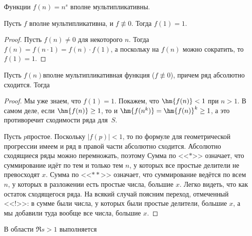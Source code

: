 \documentclass[a4paper]{article}
\def\nequiv{\not\equiv}
\begin{document}
\begin{ex}
Функции $f(n) = n^s$ вполне мультипликативны.
\end{ex}

\begin{stm}
Пусть $f$ вполне мультипликативна, и $f \nequiv 0$. Тогда $f(1) = 1$.
\end{stm}
\begin{proof}
Пусть $f(n) \neq 0$ для некоторого $n$. Тогда $f(n) = f(n \cdot 1) = f(n) \cdot f(1)$,
а поскольку на $f(n)$ можно сократить, то $f(1) = 1$.
\end{proof}

\begin{lemma}\label{lem:primeDecomposition}
Пусть $f(n)$\т  вполне мультипликативная функция ($f \nequiv 0$), причем ряд
абсолютно сходится. Тогда
\end{lemma}

\begin{proof}
Мы уже знаем, что $f(1) = 1$. Покажем, что $\hm{f(n)} < 1$ при $n > 1$. В самом деле, если
$\hm{f(n)} \ge 1$, то и $\hm{f(n^k)} = \hm{f(n)}^k \ge 1$, а это противоречит сходимости ряда для~$S$.

Пусть $p$\т простое. Поскольку $|f(p)|<1$, то по формуле для геометрической прогрессии имеем
и ряд в правой части абсолютно сходится.
Абсолютно сходящиеся ряды можно перемножать, поэтому
Сумма по <<$*$>> означает, что суммирование идёт по тем и только тем $n$, у которых все простые делители
не превосходят $x$. Сумма по <<${*}{*}$>> означает, что суммирование ведётся по всем $n$, у которых в разложении
есть простые числа, большие $x$. Легко видеть, что
как остаток сходящегося ряда. На всякий случай поясним переход, отмеченный <<!>>: в сумме были числа, у которых были
простые делители, большие $x$, а мы добавили туда вообще все числа, большие $x$.
\end{proof}

\begin{imp}
В области $\Re s>1$ выполняется
\end{imp}
\end{document}
